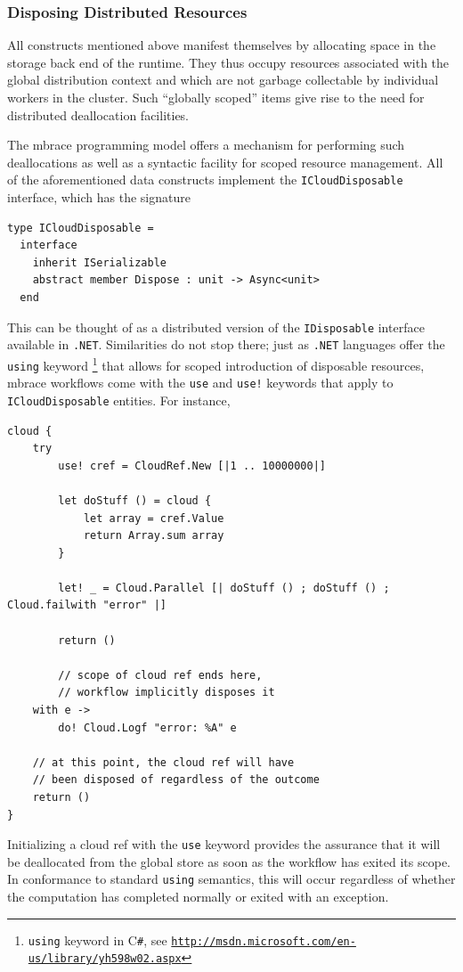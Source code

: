 \documentclass[9pt,a4paper]{article}
\newcommand{\mbrace}{mbrace}
\newcommand{\csharp}{C\texttt \#}
\newcommand{\dotnet}{\texttt{\hbox{.}NET}}
\newcommand{\samehref}[1]{\href{#1}{\texttt{#1}}}
\begin{document}
\subsubsection*{Disposing Distributed Resources}

All constructs mentioned above manifest themselves by allocating space in the
storage back end of the runtime. They thus occupy resources associated with
the global distribution context and which are not garbage collectable by
individual workers in the cluster. Such ``globally scoped'' items give rise
to the need for distributed deallocation facilities.

The \mbrace{} programming model offers a mechanism for performing such deallocations
as well as a syntactic facility for scoped resource management. 
All of the aforementioned data constructs implement the \texttt{ICloudDisposable}
interface, which has the signature
\begin{lstlisting}
type ICloudDisposable =
  interface
    inherit ISerializable
    abstract member Dispose : unit -> Async<unit>
  end
\end{lstlisting}
This can be thought of as a distributed version of the \texttt{IDisposable}
interface available in \dotnet. Similarities do not stop there; just as
\dotnet{} languages offer the \texttt{using} keyword%
\footnote{\texttt{using} keyword in \csharp, see 
\samehref{http://msdn.microsoft.com/en-us/library/yh598w02.aspx}} 
that allows for scoped introduction of disposable resources, 
\mbrace{} workflows come with the \texttt{use} and \texttt{use!} keywords that 
apply to \texttt{ICloudDisposable} entities. For instance,
\begin{lstlisting}
cloud {
	try
        use! cref = CloudRef.New [|1 .. 10000000|]

        let doStuff () = cloud {
            let array = cref.Value
            return Array.sum array
        }

        let! _ = Cloud.Parallel [| doStuff () ; doStuff () ; Cloud.failwith "error" |]

        return ()

		// scope of cloud ref ends here, 
		// workflow implicitly disposes it
	with e ->
		do! Cloud.Logf "error: %A" e
		
	// at this point, the cloud ref will have 
	// been disposed of regardless of the outcome
	return ()
}
\end{lstlisting}
Initializing a cloud ref with the \texttt{use} keyword provides the assurance 
that it will be deallocated from the global store as soon as the workflow has 
exited its scope. In conformance to standard \texttt{using} semantics,
this will occur regardless of whether the computation has completed normally
or exited with an exception.
\end{document}
